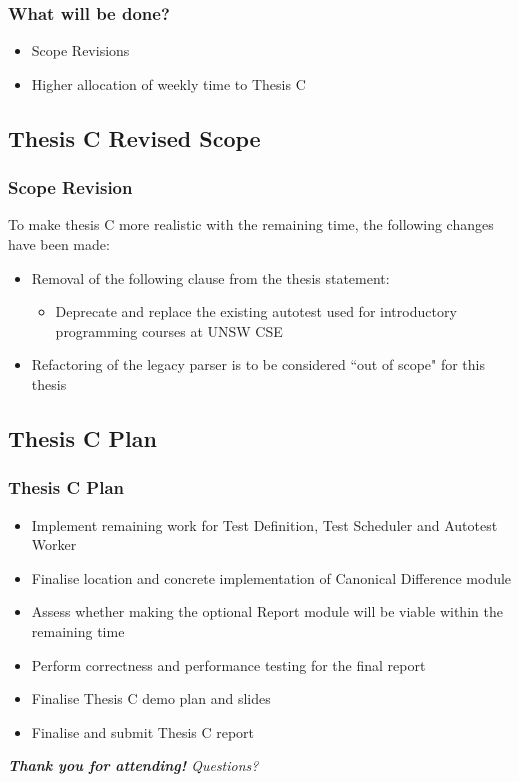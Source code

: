 \documentclass[xcolor]{beamer}
\begin{document}
\begin{frame}
	\frametitle{What will be done?}
	\begin{itemize}
		\item Scope Revisions
		\pause
		\item Higher allocation of weekly time to Thesis C
	\end{itemize}
\end{frame}

\subsection{Thesis C Revised Scope}
\begin{frame}
	\frametitle{Scope Revision}
	To make thesis C more realistic with the remaining time, the following changes have been made:
	\pause
	\begin{itemize}
		\item Removal of the following clause from the thesis statement:
		\begin{itemize}
			\item Deprecate and replace the existing autotest used for introductory programming courses at UNSW CSE
		\end{itemize}
		\pause
		\item Refactoring of the legacy parser is to be considered ``out of scope" for this thesis
	\end{itemize}
	
\end{frame}

\subsection{Thesis C Plan}
\begin{frame}
	\frametitle{Thesis C Plan}
	\begin{itemize}
		\item Implement remaining work for Test Definition, Test Scheduler and Autotest Worker
		\pause
		\item Finalise location and concrete implementation of Canonical Difference module
		\pause
		\item Assess whether making the optional Report module will be viable within the remaining time
		\pause
		\item Perform correctness and performance testing for the final report
		\pause
		\item Finalise Thesis C demo plan and slides
		\pause
		\item Finalise and submit Thesis C report
		\pause
	\end{itemize}
	\textit{\textbf{Thank you for attending!} Questions?}
\end{frame}
\end{document}

